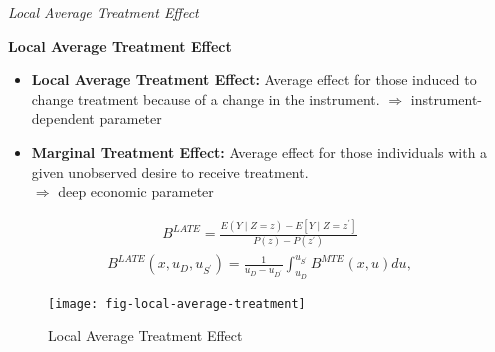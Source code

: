 \begin{frame}\begin{center}
		\LARGE\textit{Local Average Treatment Effect}
\end{center}\end{frame}
\begin{frame}
	\textbf{Local Average Treatment Effect}
	\begin{itemize}\setlength\itemsep{1em}
		\item \textbf{Local Average Treatment Effect:} Average effect for those induced
		to change treatment because of a change in the instrument.\medskip
		\(\Rightarrow\) instrument-dependent parameter\vspace{0.4cm}
		
		\item \textbf{Marginal Treatment Effect:} Average effect for those individuals
		with a given unobserved desire to receive treatment.\\\vspace{0.2cm}
		\(\Rightarrow\) deep economic parameter
	\end{itemize}
\end{frame}
\begin{frame}
	\begin{align*}
		B^{LATE} = \frac{E(Y\mid Z = z) - E[Y \mid Z = z^\prime]}{P(z) - P(z^\prime)}
	\end{align*}
	\begin{align*}
		B^{LATE}(x, u_D, u_{S^\prime}) = \frac{1}{u_D - u_{D^\prime}} \int_{u_D}^{u_{S^\prime}} B^{MTE}(x, u) du,
	\end{align*}	
\end{frame}
\begin{frame}
	\begin{figure}[htp]\centering
		\caption{Local Average Treatment Effect}\label{Local Average Treatment}\scalebox{0.35}
		{\texttt{[image: fig-local-average-treatment]}}
	\end{figure}
\end{frame}

